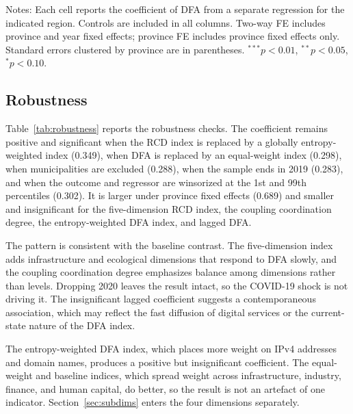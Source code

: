 \begin{table}[H]
\caption{Regional heterogeneity in the effect of DFA on RCD.}\label{tab:heterogeneity}
\begin{threeparttable}
\small

\begin{tablenotes}
\small
\item Notes: Each cell reports the coefficient of DFA from a separate regression for the indicated region. Controls are included in all columns. Two-way FE includes province and year fixed effects; province FE includes province fixed effects only. Standard errors clustered by province are in parentheses. $^{***}p<0.01$, $^{**}p<0.05$, $^{*}p<0.10$.
\end{tablenotes}
\end{threeparttable}
\end{table}

\subsection{Robustness}\label{sec:robustness}

Table~\ref{tab:robustness} reports the robustness checks. The coefficient remains positive and significant when the RCD index is replaced by a globally entropy-weighted index (0.349), when DFA is replaced by an equal-weight index (0.298), when municipalities are excluded (0.288), when the sample ends in 2019 (0.283), and when the outcome and regressor are winsorized at the 1st and 99th percentiles (0.302). It is larger under province fixed effects (0.689) and smaller and insignificant for the five-dimension RCD index, the coupling coordination degree, the entropy-weighted DFA index, and lagged DFA.

The pattern is consistent with the baseline contrast. The five-dimension index adds infrastructure and ecological dimensions that respond to DFA slowly, and the coupling coordination degree emphasizes balance among dimensions rather than levels. Dropping 2020 leaves the result intact, so the COVID-19 shock is not driving it. The insignificant lagged coefficient suggests a contemporaneous association, which may reflect the fast diffusion of digital services or the current-state nature of the DFA index.

The entropy-weighted DFA index, which places more weight on IPv4 addresses and domain names, produces a positive but insignificant coefficient. The equal-weight and baseline indices, which spread weight across infrastructure, industry, finance, and human capital, do better, so the result is not an artefact of one indicator. Section~\ref{sec:subdims} enters the four dimensions separately.

